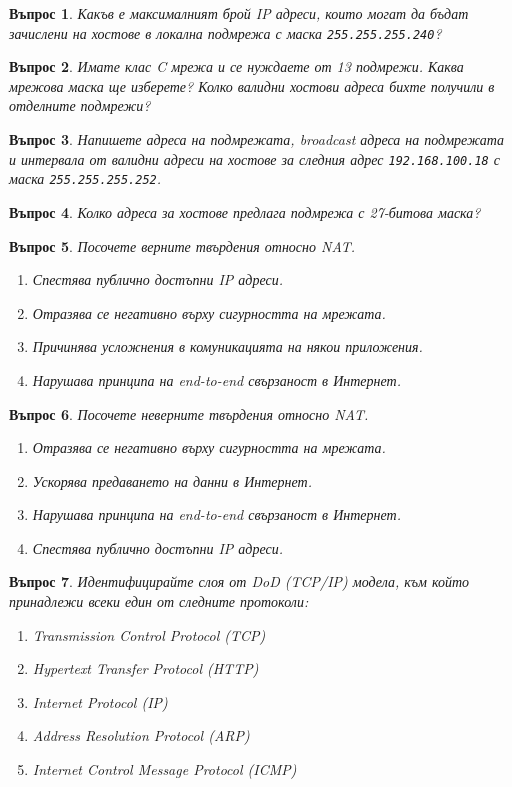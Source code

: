 \documentclass[11pt]{scrartcl}
\newtheorem{q}{Въпрос}
\newenvironment{defractors}{
\begin{enumerate}
  \setlength{\itemsep}{1pt}
  \setlength{\parskip}{0pt}
  \setlength{\parsep}{0pt}
}{\end{enumerate}}
\begin{document}
\begin{q}
  Какъв е максималният брой IP адреси, които могат да бъдат зачислени на хостове
  в локална подмрежа с маска \texttt{255.255.255.240}?
\end{q}

\begin{q}
  Имате клас C мрежа и се нуждаете от 13 подмрежи. Каква мрежова маска ще
  изберете? Колко валидни хостови адреса бихте получили в отделните подмрежи?
\end{q}

\begin{q}
  Напишете адреса на подмрежата, broadcast адреса на подмрежата и интервала от
  валидни адреси на хостове за следния адрес \texttt{192.168.100.18} с маска
  \texttt{255.255.255.252}.
\end{q}

\begin{q}
  Колко адреса за хостове предлага подмрежа с 27-битова маска?
\end{q}

\begin{q}
  Посочете верните твърдения относно NAT.

  \begin{defractors}
  \item Спестява публично достъпни IP адреси.
  \item Отразява се негативно върху сигурността на мрежата.
  \item Причинява усложнения в комуникацията на някои приложения.
  \item Нарушава принципа на end-to-end свързаност в Интернет.
  \end{defractors}
\end{q}

\begin{q}
  Посочете неверните твърдения относно NAT.
  \begin{defractors}
  \item Отразява се негативно върху сигурността на мрежата.
  \item Ускорява предаването на данни в Интернет.
  \item Нарушава принципа на end-to-end свързаност в Интернет.
  \item Спестява публично достъпни IP адреси.
  \end{defractors}
\end{q}

\begin{q}
  Идентифицирайте слоя от DoD (TCP/IP) модела, към който принадлежи всеки един
  от следните протоколи:

  \begin{defractors}
    \item Transmission Control Protocol (TCP)
    \item Hypertext Transfer Protocol (HTTP)
    \item Internet Protocol (IP)
    \item Address Resolution Protocol (ARP)
    \item Internet Control Message Protocol (ICMP)
  \end{defractors}
\end{q}
\end{document}

